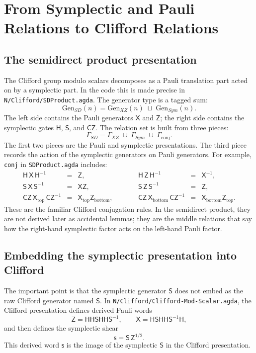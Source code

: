 \documentclass[a4paper,11pt]{article}
\newcommand{\xto}{\mathsf X}
\newcommand{\zto}{\mathsf Z}
\newcommand{\sGate}{\mathsf S}
\newcommand{\hGate}{\mathsf H}
\newcommand{\czGate}{\mathsf {CZ}}
\newcommand{\code}[1]{\texttt{#1}}
\begin{document}
\section{From Symplectic and Pauli Relations to Clifford Relations}

\subsection{The semidirect product presentation}

The Clifford group modulo scalars decomposes as a Pauli translation
part acted on by a symplectic part.  In the code this is made precise
in \code{N/Clifford/SDProduct.agda}.  The generator type is a tagged
sum:
\[
  \mathrm{Gen}_{SD}(n) = \mathrm{Gen}_{XZ}(n) \;\sqcup\;
                         \mathrm{Gen}_{Sym}(n).
\]
The left side contains the Pauli generators $\xto$ and $\zto$; the
right side contains the symplectic gates $\hGate$, $\sGate$, and
$\czGate$.  The relation set is built from three pieces:
\[
  \Gamma_{SD}
  =
  \Gamma_{XZ}
  \;\cup\;
  \Gamma_{Sym}
  \;\cup\;
  \Gamma_{\mathrm{conj}} .
\]
The first two pieces are the Pauli and symplectic presentations.
The third piece records the action of the symplectic generators on
Pauli generators.  For example, \code{conj} in
\code{SDProduct.agda} includes:
\[
\begin{array}{rclcrcl}
\hGate\,\xto\,\hGate^{-1} &=& \zto,
&\qquad&
\hGate\,\zto\,\hGate^{-1} &=& \xto^{-1},\\
\sGate\,\xto\,\sGate^{-1} &=& \xto\zto,
&&
\sGate\,\zto\,\sGate^{-1} &=& \zto,\\
\czGate\,\xto_{\mathrm{top}}\,\czGate^{-1}
  &=& \xto_{\mathrm{top}}\zto_{\mathrm{bottom}},
&&
\czGate\,\xto_{\mathrm{bottom}}\,\czGate^{-1}
  &=& \xto_{\mathrm{bottom}}\zto_{\mathrm{top}}.
\end{array}
\]
These are the familiar Clifford conjugation rules.  In the
semidirect product, they are not derived later as accidental
lemmas; they are the middle relations that say how the right-hand
symplectic factor acts on the left-hand Pauli factor.

\subsection{Embedding the symplectic presentation into Clifford}

The important point is that the symplectic generator $\sGate$ does
not embed as the raw Clifford generator named $\sGate$.  In
\code{N/Clifford/Clifford-Mod-Scalar.agda}, the Clifford presentation
defines derived Pauli words
\[
  \zto = \hGate\hGate\sGate\hGate\hGate\sGate^{-1},
  \qquad
  \xto = \hGate\sGate\hGate\hGate\sGate^{-1}\hGate,
\]
and then defines the symplectic shear
\[
  \mathsf{s} = \sGate\,\zto^{1/2}.
\]
This derived word $\mathsf{s}$ is the image of the symplectic
$\sGate$ in the Clifford presentation.
\end{document}
